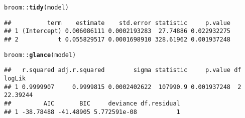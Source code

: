 \documentclass{article}\usepackage[]{graphicx}\usepackage[]{color}
\makeatletter
\newcommand{\hlopt}[1]{\textcolor[rgb]{0,0,0}{#1}}%
\newcommand{\hlstd}[1]{\textcolor[rgb]{0.345,0.345,0.345}{#1}}%
\newcommand{\hlkwd}[1]{\textcolor[rgb]{0.737,0.353,0.396}{\textbf{#1}}}%
\newenvironment{kframe}{%
 \def\at@end@of@kframe{}%
 \ifinner\ifhmode%
  \def\at@end@of@kframe{\end{minipage}}%
  \begin{minipage}{\columnwidth}%
 \fi\fi%
 \def\FrameCommand##1{\hskip\@totalleftmargin \hskip-\fboxsep
 \colorbox{shadecolor}{##1}\hskip-\fboxsep
     \hskip-\linewidth \hskip-\@totalleftmargin \hskip\columnwidth}%
 \MakeFramed {\advance\hsize-\width
   \@totalleftmargin\z@ \linewidth\hsize
   \@setminipage}}%
 {\par\unskip\endMakeFramed%
 \at@end@of@kframe}
\newenvironment{knitrout}{}{} %
\makeatother
\begin{document}
\begin{knitrout}
\color{fgcolor}\begin{kframe}
\begin{alltt}
\hlstd{broom}\hlopt{::}\hlkwd{tidy}\hlstd{(model)}
\end{alltt}
\begin{verbatim}
##          term    estimate    std.error statistic     p.value
## 1 (Intercept) 0.006086111 0.0002193283  27.74886 0.022932275
## 2           t 0.055829517 0.0001698910 328.61962 0.001937248
\end{verbatim}
\begin{alltt}
\hlstd{broom}\hlopt{::}\hlkwd{glance}\hlstd{(model)}
\end{alltt}
\begin{verbatim}
##   r.squared adj.r.squared        sigma statistic     p.value df   logLik
## 1 0.9999907     0.9999815 0.0002402622  107990.9 0.001937248  2 22.39244
##         AIC       BIC     deviance df.residual
## 1 -38.78488 -41.48905 5.772591e-08           1
\end{verbatim}
\end{kframe}
\end{knitrout}
\end{document}

